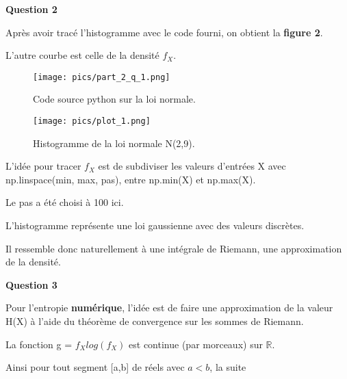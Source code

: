 \documentclass{article}
\begin{document}
		\textbf{Question 2}

\vspace{2\baselineskip}

Après avoir tracé l'histogramme avec le code fourni, on obtient la \textbf{figure 2}.

L'autre courbe est celle de la densité $f_X$.

\vspace{2\baselineskip}

\begin{figure}[h]
	\begin{minipage}[t]{0.45\textwidth}
		\centering
        	\texttt{[image: pics/part\_2\_q\_1.png]}
        	\caption{Code source python sur la loi normale.}
	\end{minipage}
	\hfill
	\begin{minipage}[t]{0.45\textwidth} %
		\centering
		\texttt{[image: pics/plot\_1.png]}
		\caption{Histogramme de la loi normale N(2,9).}
	\end{minipage}
\end{figure}
	
\vspace{2\baselineskip}

L'idée pour tracer $f_X$ est de subdiviser les valeurs d'entrées X avec np.linspace(min, max, pas), entre np.min(X) et np.max(X).

\vspace{1\baselineskip}

Le pas a été choisi à 100 ici.

\vspace{2\baselineskip}

L'histogramme représente une loi gaussienne avec des valeurs discrètes.

Il ressemble donc naturellement à une intégrale de Riemann, une approximation de la densité.

\newpage
		\textbf{Question 3}

\vspace{2\baselineskip}

Pour l'entropie \textbf{numérique}, l'idée est de faire une approximation de la valeur H(X)
à l'aide du théorème de convergence sur les sommes de Riemann.

\vspace{1\baselineskip}

La fonction g = $f_Xlog(f_X)$ est continue (par morceaux) sur $\mathbb{R}$.

Ainsi pour tout segment [a,b] de réels avec $a < b$, la suite
\end{document}
